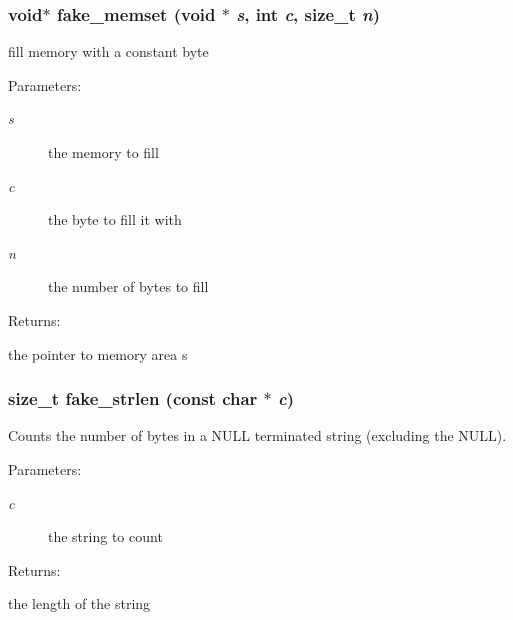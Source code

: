 \subsubsection{\setlength{\rightskip}{0pt plus 5cm}void$\ast$ fake\_\-memset (void $\ast$ {\em s}, int {\em c}, size\_\-t {\em n})}\label{fake__lib_8h_a1}


fill memory with a constant byte

\begin{Desc}
\item[Parameters: ]\par
\begin{description}
\item[{\em 
s}]the memory to fill \item[{\em 
c}]the byte to fill it with \item[{\em 
n}]the number of bytes to fill \end{description}
\end{Desc}
\begin{Desc}
\item[Returns: ]\par
the pointer to memory area s \end{Desc}
\subsubsection{\setlength{\rightskip}{0pt plus 5cm}size\_\-t fake\_\-strlen (const char $\ast$ {\em c})}\label{fake__lib_8h_a0}


Counts the number of bytes in a NULL terminated string (excluding the NULL).

\begin{Desc}
\item[Parameters: ]\par
\begin{description}
\item[{\em 
c}]the string to count \end{description}
\end{Desc}
\begin{Desc}
\item[Returns: ]\par
the length of the string \end{Desc}
